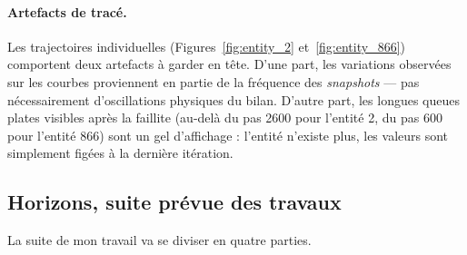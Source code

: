 \documentclass[10pt,a4paper]{article}
\begin{document}
\paragraph{Artefacts de tracé.} Les trajectoires individuelles (Figures~\ref{fig:entity_2} et~\ref{fig:entity_866}) comportent deux artefacts à garder en tête. D'une part, les variations observées sur les courbes proviennent en partie de la fréquence des \textit{snapshots} — pas nécessairement d'oscillations physiques du bilan. D'autre part, les longues queues plates visibles après la faillite (au-delà du pas \num{2600} pour l'entité 2, du pas \num{600} pour l'entité 866) sont un gel d'affichage : l'entité n'existe plus, les valeurs sont simplement figées à la dernière itération.

\subsection{Horizons, suite prévue des travaux}
La suite de mon travail va se diviser en quatre parties.
\end{document}

